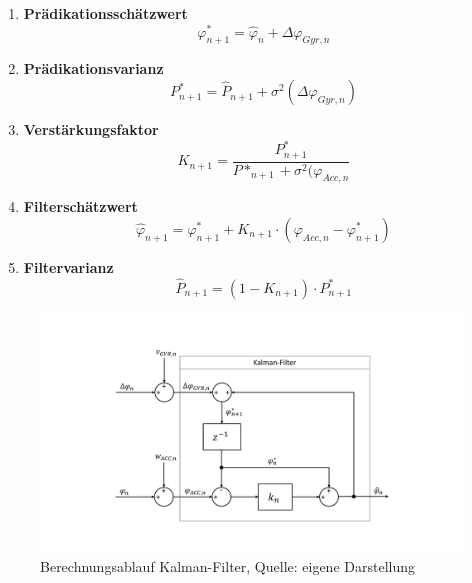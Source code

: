 \begin{enumerate}
\item \textbf{Prädikationsschätzwert}
\begin{equation}
\varphi^*_{n+1} = \hat{\varphi}_n + \Delta \varphi_{Gyr,n}
\end{equation}
\item \textbf{Prädikationsvarianz}
\begin{equation}
P^*_{n+1} = \hat{P}_{n+1} + \sigma^2(\Delta \varphi_{Gyr,n})
\end{equation}
\item \textbf{Verstärkungsfaktor}
\begin{equation}
K_{n+1} = \frac{P^*_{n+1}}{P*_{n+1} + \sigma^2(\varphi_{Acc,n}}
\end{equation}
\item \textbf{Filterschätzwert}
\begin{equation}
\hat{\varphi}_{n+1} = \varphi^*_{n+1} + K_{n+1} \cdot (\varphi_{Acc,n} - \varphi^*_{n+1})
\end{equation}
\item \textbf{Filtervarianz}
\begin{equation}
\hat{P}_{n+1} = (1-K_{n+1}) \cdot P^*_{n+1}
\end{equation}
\end{enumerate}

\begin{figure}[h!]
\centering
\includegraphics[width=0.8\linewidth]{img/kalman_overview2}
\caption{Berechnungsablauf Kalman-Filter, Quelle: eigene Darstellung}
\end{figure}